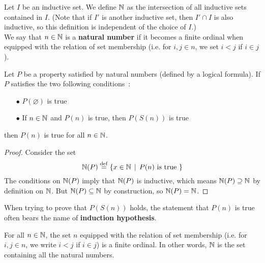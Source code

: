 \begin{definition} \label{natural-numbers}
    Let $I$ be an inductive set. We define $\operatorname{\mathbb N}$ as the intersection of all inductive sets contained in $I$. (Note that if $I'$ is another inductive set, then $I' \cap I$ is also inductive, so this definition is independent of the choice of $I$.)
    \\

    We say that $n \in \operatorname{\mathbb N}$ is a \textbf{natural number} if it becomes a finite ordinal when equipped with the relation of set membership (i.e. for $i,j \in n$, we set $i < j$ if $i \in j$).
\end{definition}

\begin{theorem} \label{weak-induction-on-natural-numbers}
    Let $P$ be a property satisfied by natural numbers (defined by a logical formula). If $P$ satisfies the two following conditions~:
    \\

    \begin{itemize}
        \item[$\bullet$] $P(\varnothing)$ is true
        \\

        \item[$\bullet$] If $n \in \operatorname{\mathbb N}$ and $P(n)$ is true, then $P(S(n))$ is true
        \\

    \end{itemize}
    then $P(n)$ is true for all $n \in \operatorname{\mathbb N}$.
\end{theorem}

\begin{proof}
    Consider the set
    \[
        \operatorname{\mathbb N}(P) \overset{\mathrm{def}}{=} \{ x \in \operatorname{\mathbb N} \, \mid \, P(n) \text{ is true } \}    
    \]
    The conditions on $\operatorname{\mathbb N}(P)$ imply that $\operatorname{\mathbb N}(P)$ is inductive, which means $\operatorname{\mathbb N}(P) \supseteq \operatorname{\mathbb N}$ by definition on $\operatorname{\mathbb N}$. But $\operatorname{\mathbb N}(P) \subseteq \operatorname{\mathbb N}$ by construction, so $\operatorname{\mathbb N}(P) = \operatorname{\mathbb N}$. 
\end{proof}

\begin{remark}
    When trying to prove that $P(S(n))$ holds, the statement that $P(n)$ is true often bears the name of \textbf{induction hypothesis}.
\end{remark}

\begin{lemma} \label{natural-numbers-are-finite-ordinals}
    For all $n \in \operatorname{\mathbb N}$, the set $n$ equipped with the relation of set membership (i.e. for $i,j \in n$, we write $i < j$ if $i \in j$) is a finite ordinal. In other words, $\operatorname{\mathbb N}$ is the set containing all the natural numbers.
\end{lemma}


